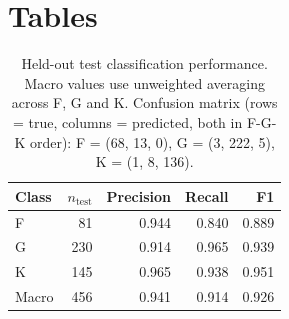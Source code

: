 \documentclass[11pt,a4paper]{article}
\begin{document}
\section*{Tables}

\begin{table}[ht]
\centering
\caption{Held-out test classification performance. Macro values use unweighted averaging across F, G and K. Confusion matrix (rows = true, columns = predicted, both in F-G-K order): F = (68, 13, 0), G = (3, 222, 5), K = (1, 8, 136).}
\label{tab:test-perf}
\begin{tabular}{lrrrr}
\toprule
Class & $n_{\mathrm{test}}$ & Precision & Recall & F1 \\
\midrule
F     & 81  & 0.944 & 0.840 & 0.889 \\
G     & 230 & 0.914 & 0.965 & 0.939 \\
K     & 145 & 0.965 & 0.938 & 0.951 \\
\midrule
Macro & 456 & 0.941 & 0.914 & 0.926 \\
\bottomrule
\end{tabular}
\end{table}
\end{document}
